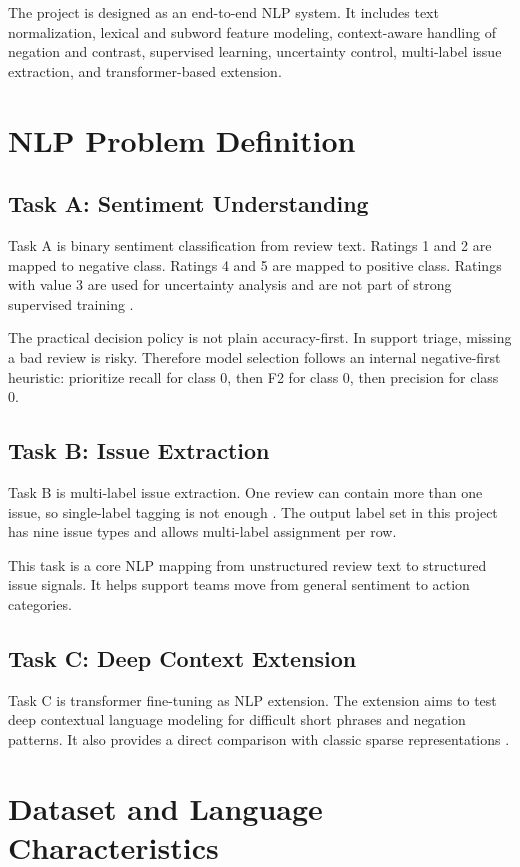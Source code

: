 \documentclass[12pt,a4paper]{article}
\begin{document}
The project is designed as an end-to-end NLP system. It includes text normalization, lexical and subword feature modeling, context-aware handling of negation and contrast, supervised learning, uncertainty control, multi-label issue extraction, and transformer-based extension.

\section{NLP Problem Definition}
\subsection{Task A: Sentiment Understanding}
Task A is binary sentiment classification from review text. Ratings 1 and 2 are mapped to negative class. Ratings 4 and 5 are mapped to positive class. Ratings with value 3 are used for uncertainty analysis and are not part of strong supervised training \cite{turney2002,wang2012}.

The practical decision policy is not plain accuracy-first. In support triage, missing a bad review is risky. Therefore model selection follows an internal negative-first heuristic: prioritize recall for class 0, then F2 for class 0, then precision for class 0.

\subsection{Task B: Issue Extraction}
Task B is multi-label issue extraction. One review can contain more than one issue, so single-label tagging is not enough \cite{tsoumakas2011,zhang2014}. The output label set in this project has nine issue types and allows multi-label assignment per row.

This task is a core NLP mapping from unstructured review text to structured issue signals. It helps support teams move from general sentiment to action categories.

\subsection{Task C: Deep Context Extension}
Task C is transformer fine-tuning as NLP extension. The extension aims to test deep contextual language modeling for difficult short phrases and negation patterns. It also provides a direct comparison with classic sparse representations \cite{vaswani2017,devlin2019}.

\section{Dataset and Language Characteristics}
\end{document}
